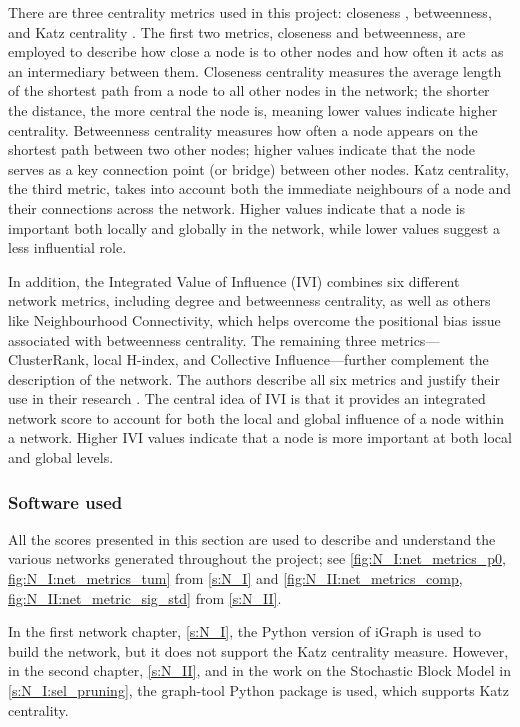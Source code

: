 There are three centrality metrics used in this project: closeness \citet{Opsahl2010-ok}, betweenness\citet{Freeman1977-qe}, and Katz centrality \citet{Katz1953-ie}. The first two metrics, closeness and betweenness, are employed to describe how close a node is to other nodes and how often it acts as an intermediary between them. Closeness centrality measures the average length of the shortest path from a node to all other nodes in the network; the shorter the distance, the more central the node is, meaning lower values indicate higher centrality. Betweenness centrality measures how often a node appears on the shortest path between two other nodes; higher values indicate that the node serves as a key connection point (or bridge) between other nodes. Katz centrality, the third metric, takes into account both the immediate neighbours of a node and their connections across the network. Higher values indicate that a node is important both locally and globally in the network, while lower values suggest a less influential role.

 
In addition, the Integrated Value of Influence (IVI) \cite{Salavaty2020-wo} combines six different network metrics, including degree and betweenness centrality, as well as others like Neighbourhood Connectivity, which helps overcome the positional bias issue associated with betweenness centrality. The remaining three metrics—ClusterRank, local H-index, and Collective Influence—further complement the description of the network. The authors describe all six metrics and justify their use in their research \citet{Salavaty2020-wo}. The central idea of IVI is that it provides an integrated network score to account for both the local and global influence of a node within a network. Higher IVI values indicate that a node is more important at both local and global levels.


\subsubsection{Software used} \label{s:lit:net_software}

All the scores presented in this section are used to describe and understand the various networks generated throughout the project; see \cref{fig:N_I:net_metrics_p0, fig:N_I:net_metrics_tum} from \cref{s:N_I} and \cref{fig:N_II:net_metrics_comp, fig:N_II:net_metric_sig_std} from \cref{s:N_II}. 

In the first network chapter, \cref{s:N_I}, the Python version of iGraph \citet{Csardi2006-ez} is used to build the network, but it does not support the Katz centrality measure. However, in the second chapter, \cref{s:N_II}, and in the work on the Stochastic Block Model in \cref{s:N_I:sel_pruning}, the graph-tool Python package \citep{Peixoto2014-ls} is used, which supports Katz centrality.

